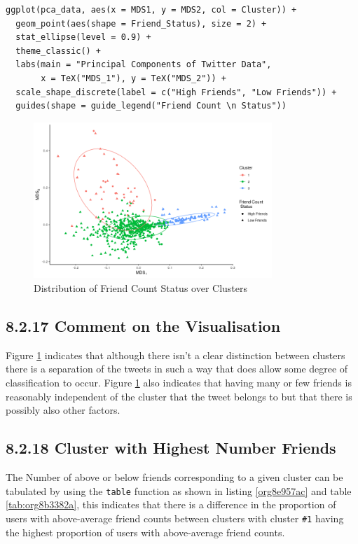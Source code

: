 \documentclass[11pt]{article}
\begin{document}
\begin{listing}[htbp]
\begin{verbatim}
ggplot(pca_data, aes(x = MDS1, y = MDS2, col = Cluster)) +
  geom_point(aes(shape = Friend_Status), size = 2) +
  stat_ellipse(level = 0.9) +
  theme_classic() +
  labs(main = "Principal Components of Twitter Data",
       x = TeX("MDS_1"), y = TeX("MDS_2")) +
  scale_shape_discrete(label = c("High Friends", "Low Friends")) +
  guides(shape = guide_legend("Friend Count \n Status"))
\end{verbatim}
\caption{\label{orga8212a2}Create a plot of the distribution of Friends Count Status as shown in figure \ref{fig:org3530622}}
\end{listing}

\begin{figure}[htbp]
\centering
\includegraphics[width=9cm]{./Figures/betclustplot8216.png}
\caption{\label{fig:org3530622}Distribution of Friend Count Status over Clusters}
\end{figure}

\subsection{8.2.17 Comment on the Visualisation}
\label{sec:orgbbcafee}
Figure \ref{fig:org3530622} indicates that although there isn't a clear distinction between
clusters there is a separation of the tweets in such a way that does allow some
degree of classification to occur. Figure \ref{fig:org3530622}  also indicates that having
many or few friends is reasonably independent of the cluster that the tweet
belongs to but that there is possibly also other factors.
\subsection{8.2.18 Cluster with Highest Number Friends}
\label{sec:orgce5830b}
The Number of above or below friends corresponding to a given cluster can be tabulated by using the \texttt{table} function as shown in listing \ref{org8e957ac} and table \ref{tab:org8b3382a}, this indicates that there is a difference in the proportion of users with above-average friend counts between clusters with cluster \texttt{\#1} having the highest proportion of users with above-average friend counts.
\end{document}
